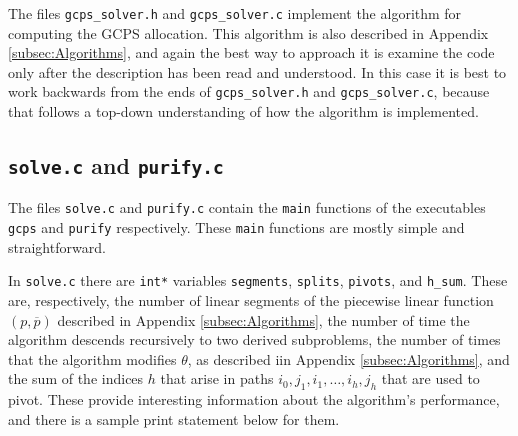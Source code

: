 \documentclass[12pt]{article}
\theoremstyle{definition}
\newcommand{\barp}{\overline{p}}
\begin{document}
\begin{appendix}
The files \texttt{gcps\_solver.h} and \texttt{gcps\_solver.c}
implement the algorithm for computing the GCPS allocation.  This
algorithm is also described in Appendix \ref{subsec:Algorithms}, and
again the best way to approach it is examine the code only after the
description has been read and understood.  In this case it is best to
work backwards from the ends of \texttt{gcps\_solver.h} and
\texttt{gcps\_solver.c}, because that follows a top-down understanding
of how the algorithm is implemented.

\subsection{\texttt{solve.c} and  \texttt{purify.c}}

The files \texttt{solve.c} and \texttt{purify.c} contain the
\texttt{main} functions of the executables \texttt{gcps} and
\texttt{purify} respectively.  These \texttt{main} functions are
mostly simple and straightforward.

In \texttt{solve.c} there are \texttt{int*} variables
\texttt{segments}, \texttt{splits}, \texttt{pivots}, and
\texttt{h\_sum}.  These are, respectively, the number of linear
segments of the piecewise linear function $(p,\barp)$ described in
Appendix \ref{subsec:Algorithms}, the number of time the algorithm
descends recursively to two derived subproblems, the number of times
that the algorithm modifies $\theta$, as described iin Appendix
\ref{subsec:Algorithms}, and the sum of the indices $h$ that arise in
paths $i_0,j_1, i_1, \ldots, i_h, j_h$ that are used to pivot.  These
provide interesting information about the algorithm's performance, and
there is a sample print statement below for them.


\end{appendix}



\end{document}
